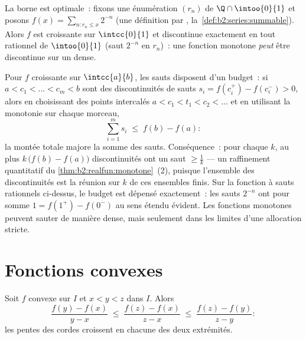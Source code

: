 \begin{example}
La borne est optimale~: fixons une énumération $(r_n)$ de $\Q \cap
\intoo{0}{1}$ et posons $f(x) = \sum_{n : r_n \leq x} 2^{-n}$
(une définition par ,
la~\cref{def:b2:series:summable}). Alors $f$ est croissante sur
$\intcc{0}{1}$ et discontinue exactement en tout rationnel de
$\intoo{0}{1}$ (saut $2^{-n}$ en $r_n$)~: une fonction monotone
\emph{peut} être discontinue sur un  dense.
\end{example}

\begin{example}\label{ex:b2:realfun:jumpbudget}
Pour $f$ croissante sur $\intcc{a}{b}$, les sauts disposent d'un
budget~: si $a < c_1 < \dots < c_m < b$ sont des discontinuités de
sauts $s_i = f(c_i^+) - f(c_i^-) > 0$, alors en choisissant des
points intercalés $a < c_1 < t_1 < c_2 < \dots$ et en utilisant la
monotonie sur chaque morceau,
\[
\sum_{i=1}^{m} s_i \;\leq\; f(b) - f(a) :
\]
la montée totale majore la somme des sauts. Conséquence~: pour
chaque $k$, au plus $k\,\bigl(f(b) - f(a)\bigr)$ discontinuités
ont un saut $\geq \frac1k$ --- un raffinement quantitatif du
\cref{thm:b2:realfun:monotone}~(2), puisque l'ensemble des
discontinuités est la réunion  sur $k$ de ces ensembles
finis. Sur la fonction à sauts rationnels ci-dessus, le budget est
dépensé exactement~: les sauts $2^{-n}$ ont pour somme $1 = f(1^+) -
f(0^-)$ au sens étendu évident. Les fonctions monotones peuvent
sauter de manière dense, mais seulement dans les limites d'une
allocation stricte.
\end{example}

\section{Fonctions convexes}

\begin{lemma}\label{lem:b2:realfun:slopes}
Soit $f$ convexe sur $I$ et $x < y < z$ dans $I$. Alors
\[
\frac{f(y) - f(x)}{y - x}
\;\leq\; \frac{f(z) - f(x)}{z - x}
\;\leq\; \frac{f(z) - f(y)}{z - y} :
\]
les pentes des cordes croissent en chacune des deux
extrémités.
\end{lemma}


